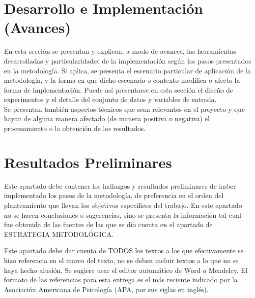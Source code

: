\documentclass[spanish, 12pt, letterpaper]{poli}
\begin{document}
\section{Desarrollo e Implementación (Avances)}
En esta sección se presentan y explican, a modo de avances, las herramientas desarrolladas y particularidades de la implementación según los pasos presentados en la metodología. Si aplica, se presenta el escenario particular de aplicación de la metodología, y la forma en que dicho escenario o contexto modifica o afecta la forma de implementación. Puede así presentarse en esta sección el diseño de experimentos y el detalle del conjunto de datos y variables de entrada.\\
Se presentan también aspectos técnicos que sean relevantes en el proyecto y que hayan de alguna manera afectado (de manera positiva o negativa) el procesamiento o la obtención de los resultados.


\section{Resultados Preliminares}
Este apartado debe contener los hallazgos y resultados preliminares de haber implementado los pasos de la metodología, de preferencia en el orden del planteamiento que llevan los objetivos específicos del trabajo. En este apartado no se hacen conclusiones o sugerencias, sino se presenta la información tal cual fue obtenida de las fuentes de las que se dio cuenta en el apartado de ESTRATEGIA METODOLÓGICA.



Este apartado debe dar cuenta de TODOS los textos a los que efectivamente se hizo referencia en el marco del texto, no se deben incluir textos a lo que no se haya hecho alusión. Se sugiere usar el editor automático de Word o Mendeley. El formato de las referencias para esta entrega es el más reciente indicado por la Asociación Americana de Psicología (APA, por sus siglas en inglés).
\end{document}
